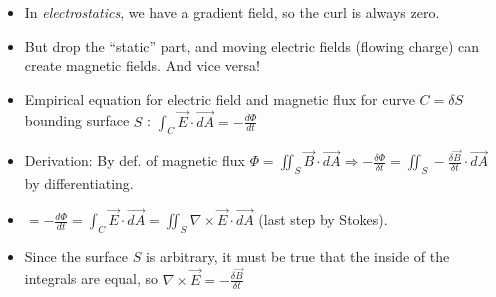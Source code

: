 \documentclass[11pt, oneside]{article}   	%
\begin{document}
\begin{itemize}
\item In \emph{electrostatics}, we have a gradient field, so the curl is always zero.
\item But drop the ``static'' part, and moving electric fields (flowing charge) can create magnetic fields.  And vice versa!
\item Empirical equation for electric field and magnetic flux for curve $C=\delta S$ bounding surface $S$ : $\int_C \vec{E} \cdot \vec{dA} = -\frac{d \Phi}{dt}$
\item Derivation: By def. of magnetic flux $\Phi = \iint_S \vec{B} \cdot \vec{dA} \Rightarrow  -\frac{\delta \Phi}{\delta t} =  \iint_S -\frac{\delta \vec{B}}{\delta t} \cdot \vec{dA}$  by differentiating.
\item $= -\frac{d \Phi}{dt} = \int_C \vec{E} \cdot \vec{dA} = \iint_S \nabla \times \vec{E} \cdot \vec{dA}$ (last step by Stokes).
\item Since the surface $S$ is arbitrary, it must be true that the inside of the integrals are equal, so $\nabla \times \vec{E} =- \frac{\delta \vec{B}}{\delta t}$
\end{itemize}
\end{document}
